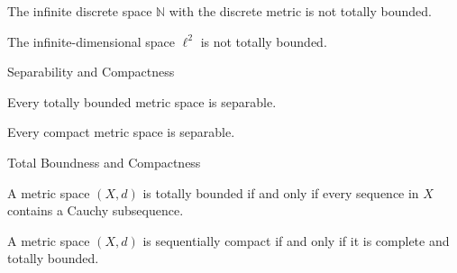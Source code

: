 \documentclass[12pt, a4paper]{article}
\begin{document}
\vspace{140pt} 

\begin{problem}
    The infinite discrete space $\mathbb{N}$ with the discrete metric is not totally bounded.
\end{problem}

\vspace{140pt} 

\begin{problem}
    The infinite-dimensional space $\ell^2$ is not totally bounded.
\end{problem}

\clearpage

\begin{heading}
    Separability and Compactness
\end{heading}

\vspace{10pt}

\begin{theorem}
    Every totally bounded metric space is separable.
\end{theorem}

\clearpage

\begin{theorem}
    Every compact metric space is separable.
\end{theorem}

\clearpage

\begin{heading}
    Total Boundness and Compactness
\end{heading}

\vspace{10pt}

\begin{theorem}
    A metric space $(X, d)$ is totally bounded if and only if every sequence in $X$ contains a Cauchy subsequence.
\end{theorem}

\clearpage

\begin{theorem}
    A metric space $(X, d)$ is sequentially compact if and only if it is complete and totally bounded.
\end{theorem}

\clearpage
\end{document}
